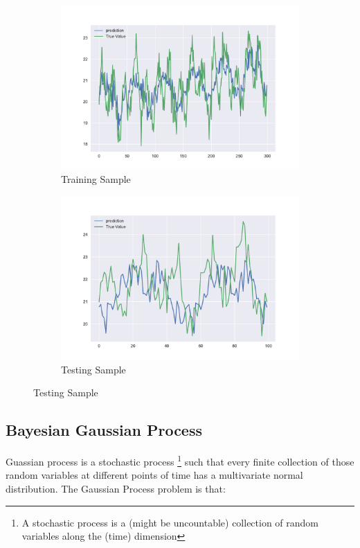\documentclass[letterpaper,12pt]{article}
\begin{document}
\begin{figure}[H]
	\centering
	\caption{STL Model Prediction}
	\begin{subfigure}[h]{0.48\textwidth}
		\centering
		\includegraphics[width=\textwidth]{prediction_training.pdf}
		\caption{Training Sample}
	\end{subfigure}
	\begin{subfigure}[h]{0.48\textwidth}
		\centering
		\includegraphics[width=\textwidth]{prediction_testing.pdf}
		\caption{Testing Sample}
	\end{subfigure}
	\label{match_map}
\end{figure}

\subsection{Bayesian Gaussian Process}
Guassian process is a stochastic process \footnote{A stochastic process is a (might be uncountable) collection of random variables along the (time) dimension} such that every finite collection of those random variables at different points of time has a multivariate normal distribution. The Gaussian Process problem is that:\\
\end{document}
